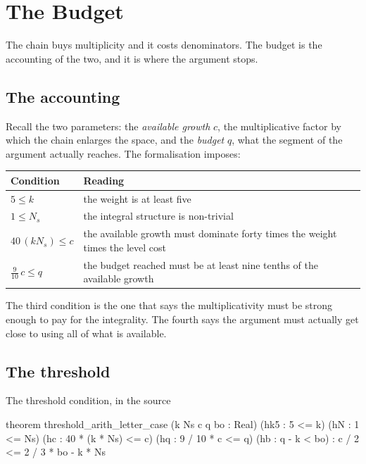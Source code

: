 
\chapter{The Budget}
\label{ch:budget2}

The chain buys multiplicity and it costs denominators. The budget is the
accounting of the two, and it is where the argument stops.

\section{The accounting}Recall the two parameters: the \emph{available growth} $c$, the multiplicative
factor by which the chain enlarges the space, and the \emph{budget} $q$, what
the segment of the argument actually reaches. The formalisation imposes:

\begin{center}
\begin{tabular}{@{}>{\RaggedRight\arraybackslash\hyphenpenalty=10000\exhyphenpenalty=10000}p{}>{\RaggedRight\arraybackslash\hyphenpenalty=10000\exhyphenpenalty=10000}p{}@{}}
\toprule
\textbf{Condition} & \textbf{Reading} \\
\midrule
$5 \le k$ & the weight is at least five \\
$1 \le N_s$ & the integral structure is non-trivial \\
$40\,(kN_s) \le c$ & the available growth must dominate forty times the
weight times the level cost \\
$\tfrac{9}{10}\,c \le q$ & the budget reached must be at least nine tenths
of the available growth \\
\bottomrule
\end{tabular}
\end{center}

The third condition is the one that says the multiplicativity must be strong
enough to pay for the integrality. The fourth says the argument must actually
get close to using all of what is available.

\section{The threshold}\begin{seamnote}{The threshold condition, in the source}
{\footnotesize
\begin{leanquote}
theorem threshold_arith_letter_case (k Ns c q bo : Real)
(hk5 : 5 <= k) (hN : 1 <= Ns) (hc : 40 * (k * Ns) <= c) (hq
      : 9 / 10 * c <= q)
    (hb : q - k < bo) : c / 2 <= 2 / 3 * bo - k * Ns
\end{leanquote}
}
\end{seamnote}

